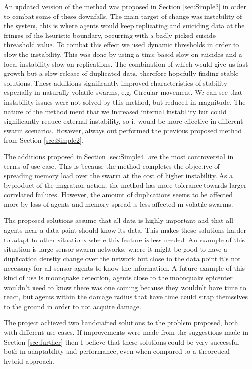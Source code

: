 \documentclass{UoYCSproject}
\begin{document}
An updated version of the method was proposed in Section \ref{sec:Simple3} in order to combat some of these downfalls. 
The main target of change was instability of the system, this is where agents would keep replicating and suiciding data at the fringes of the heuristic boundary, occurring with a badly picked suicide threashold value. 
To combat this effect we used dynamic thresholds in order to slow the instability. 
This was done by using a time based slow on suicides and a local instability slow on replications. 
The combination of which would give us fast growth but a slow release of duplicated data, therefore hopefully finding stable solutions. 
These additions significantly improved characteristics of stability especially in naturally volatile swarms, e.g. Circular movement. 
We can see that instability issues were not solved by this method, but reduced in magnitude. 
The nature of the method ment that we increased internal instability but could significantly reduce external instability, so it would be more effective in different swarm scenarios. 
However, always out performed the previous proposed method from Section \ref{sec:Simple2}.

The additions proposed in Section \ref{sec:Simple4} are the most controversial in terms of use case. 
This is because the method completes the objective of spreading memory load over the swarm at the cost of higher instability. 
As a byproduct of the migration action, the method has more tolerance towards larger correlated failures. 
However, the amount of duplications seems to be affected more by loss of agents and memory spread is less affected in volatile swarms.

The proposed solutions assume that all data is highly important and that all agents near a data point should know its data. 
This makes these solutions harder to adapt to other situations where this feature is less needed. 
An example of this situation is large sensor swarm networks, where it might be good to have a duplication density change over the network but close to the data point it's not necessary for all sensor agents to know the information. 
A future example of this kind of use is moonquake detection, agents close to the moonquake epicenter wouldn’t need to know there was one coming because they wouldn’t have time to react, but agents within the damage radius that have time could strap themselves to the ground in order to not acquire damage. 

The project achieved two handcrafted solutions to the problem proposed, both with different use cases. 
If improvements were made from the suggestions made in Section \ref{sec:further} then I believe that these solutions could be very successful both in adaptability and performance, even when compared to a theoretical hybrid approach.
\end{document}
